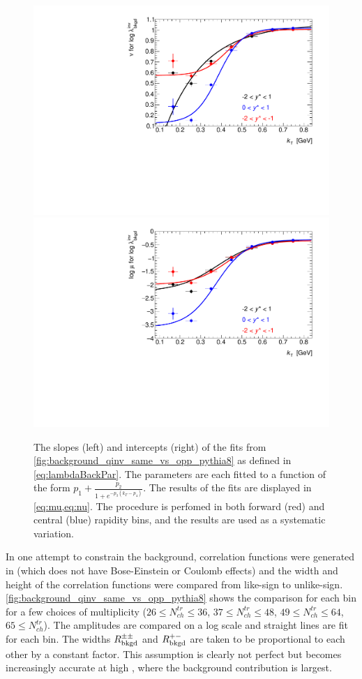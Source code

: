 \begin{figure}[t]
\begin{minipage}[t]{1.0\textwidth}
\centering
\includegraphics[width=.49\linewidth]{can_kt_qinv_backLambda_slope_combined.pdf}
\includegraphics[width=.49\linewidth]{can_kt_qinv_backLambda_intercept_combined.pdf}
\end{minipage}
\caption{The slopes (left) and intercepts (right) of the fits from \cref{fig:background_qinv_same_vs_opp_pythia8} as defined in \cref{eq:lambdaBackPar}. The parameters are each fitted to a function of the form $p_1 + \frac{p_2}{1 + e^{-p_3(k_T - p_4)}}$. The results of the fits are displayed in \cref{eq:mu,eq:nu}. The procedure is perfomed in both forward (red) and central (blue) rapidity bins, and the results are used as a systematic variation.}
\label{fig:background_qinv_same_vs_opp_pythia8_fits}
\end{figure}

In one attempt to constrain the background, correlation functions were generated in  (which does not have Bose-Einstein or Coulomb effects) and the width and height of the correlation functions were compared from like-sign to unlike-sign.
\cref{fig:background_qinv_same_vs_opp_pythia8} shows the comparison for each \kt bin for a few choices of multiplicity ($26 \leq N_{ch}^{tr} \leq36$, $37 \leq N_{ch}^{tr} \leq48$, $49 \leq N_{ch}^{tr} \leq64$, $65 \leq N_{ch}^{tr}$).
The amplitudes are compared on a log scale and straight lines are fit for each \kt bin.
The widths $R_{\mathrm{bkgd}}^{\pm\pm}$ and $R_{\mathrm{bkgd}}^{+-}$ are taken to be proportional to each other by a constant factor.
This assumption is clearly not perfect but becomes increasingly accurate at high \kt, where the background contribution is largest.

